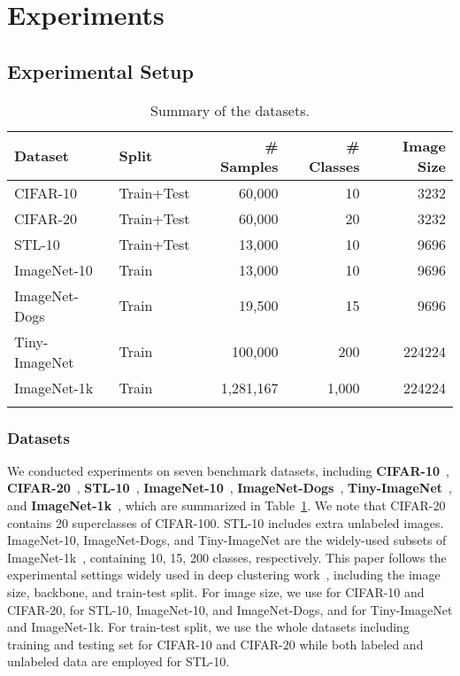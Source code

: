 \section{Experiments}
\label{sec:exp}

\subsection{Experimental Setup}

\begin{table}[t]
  \centering
  \caption{Summary of the datasets.}
  \label{tab:dataset}
  \scalebox{0.95}
  {\begin{tabular}{llrrr}
    \shline
    \textbf{Dataset} & \textbf{Split}      & \# \textbf{Samples} & \# \textbf{Classes} & \textbf{Image Size} \\
    \midrule
    CIFAR-10                    & Train+Test & 60,000 & 10   & 3232 \\
    CIFAR-20                    & Train+Test & 60,000  & 20  & 3232 \\
    STL-10                      & Train+Test & 13,000 & 10   & 9696 \\
    ImageNet-10                 & Train      & 13,000 & 10   & 9696  \\
    ImageNet-Dogs               & Train      & 19,500   & 15   & 9696  \\
    Tiny-ImageNet               & Train      & 100,000  & 200   & 224224  \\
    ImageNet-1k                    & Train      & 1,281,167                   & 1,000                        & 224224  \\
    \shline
    \end{tabular}
  }
\end{table}

\subsubsection{Datasets}
We conducted experiments on seven benchmark datasets, including \textbf{CIFAR-10}~\cite{krizhevsky2009learning}, \textbf{CIFAR-20}~\cite{krizhevsky2009learning}, \textbf{STL-10}~\cite{coates2011analysis}, \textbf{ImageNet-10}~\cite{chang2017deep}, \textbf{ImageNet-Dogs}~\cite{chang2017deep}, \textbf{Tiny-ImageNet}~\cite{le2015tiny}, and \textbf{ImageNet-1k}~\cite{deng2009imagenet}, which are summarized in Table~\ref{tab:dataset}. We note that CIFAR-20 contains 20 superclasses of CIFAR-100. STL-10 includes extra unlabeled images. ImageNet-10, ImageNet-Dogs, and Tiny-ImageNet are the widely-used subsets of ImageNet-1k~\cite{deng2009imagenet}, containing 10, 15, 200 classes, respectively. This paper follows the experimental settings widely used in deep clustering work~\cite{chang2017deep,wu2019deep,ji2019invariant,tsai2020mice,tao2021clustering}, including the image size, backbone, and train-test split. For image size, we use  for CIFAR-10 and CIFAR-20,  for STL-10, ImageNet-10, and ImageNet-Dogs, and  for Tiny-ImageNet and ImageNet-1k. For train-test split, we use the whole datasets including training and testing set for CIFAR-10 and CIFAR-20 while both labeled and unlabeled data are employed for STL-10.

